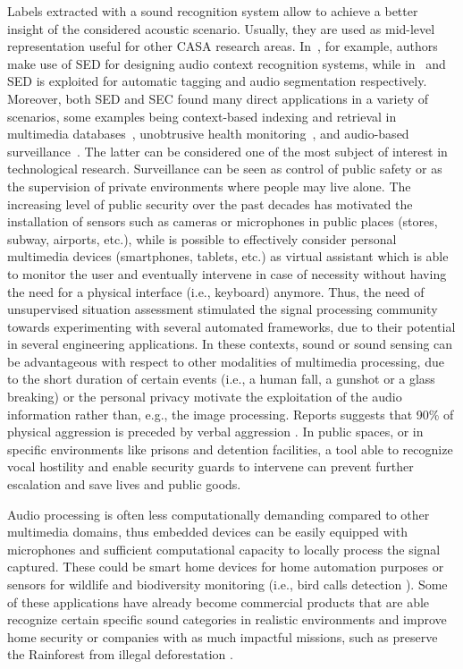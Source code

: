 Labels extracted with a sound recognition system allow to achieve a better insight of the considered acoustic scenario. Usually, they are used as mid-level representation useful for other CASA research areas. In~\cite{chu2009environmental, heittola2010audio}, for example, authors make use of SED for designing audio context recognition systems, while in~\cite{shah2012lifelogging} and~\cite{wichern2010segmentation} SED is exploited for automatic tagging and audio segmentation respectively. Moreover, both SED and SEC found many direct applications in a variety of scenarios, some examples being context-based indexing and retrieval in multimedia databases~\cite{xu2008audio}, unobtrusive health monitoring~\cite{peng2009healthcare}, and audio-based surveillance~\cite{harma2005automatic, crocco2014surveillance, Principi2016a}.
The latter can be considered one of the most subject of interest in technological research. Surveillance can be seen as control of public safety or as the supervision of private environments where people may live alone.  The increasing level of public security over the past decades has motivated the installation of sensors such as cameras or microphones in public places (stores, subway, airports, etc.), while is possible to effectively consider personal multimedia devices (smartphones, tablets, etc.) as virtual assistant which is able to monitor the user and eventually intervene in case of necessity without having the need for a physical interface (i.e., keyboard) anymore.
Thus, the need of unsupervised situation assessment stimulated the signal processing community towards experimenting with several automated frameworks, due to their potential in several engineering applications.
In these contexts, sound or sound sensing can be advantageous with respect to other modalities of multimedia processing, due to the short duration of certain events (i.e., a human fall, a gunshot or a glass breaking) or the personal privacy motivate the exploitation of the audio information rather than, e.g., the image processing. Reports suggests that 90\% of physical aggression is preceded by verbal aggression \cite{boudoukha2011burnout}. In public spaces, or in specific environments like prisons and detention facilities, a tool able to recognize vocal hostility and enable security guards to intervene can prevent further escalation and save lives and public goods. 

Audio processing is often less computationally demanding compared to other multimedia domains, thus embedded devices can be easily equipped with microphones and sufficient computational capacity to locally process the signal captured. These could be smart home devices for home automation purposes or sensors for wildlife and biodiversity monitoring (i.e., bird calls detection \cite{grill2017two}). 
Some of these applications have already become commercial products that are able recognize certain specific sound categories in realistic environments and improve home security \cite{audioanalytic}  or companies with as much impactful missions, such as preserve the Rainforest from illegal deforestation \cite{rainforest}.

